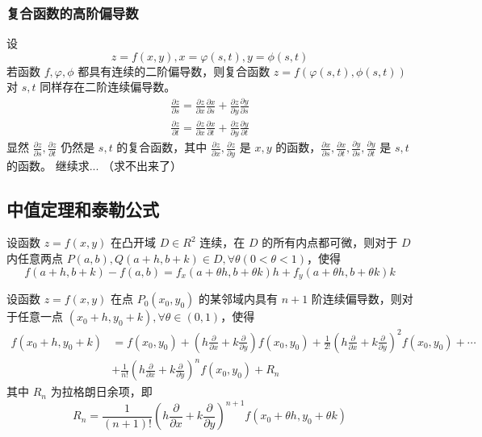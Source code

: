 \subsubsection{复合函数的高阶偏导数}

设
\[
    z=f(x,y), x=\varphi(s,t), y=\phi(s,t)
\]
若函数 $f,\varphi,\phi$ 都具有连续的二阶偏导数，则复合函数 $z=f(\varphi(s,t),\phi(s,t))$ 对 $s,t$ 同样存在二阶连续偏导数。
\[
    \begin{aligned}
        \frac{\partial z}{\partial s}=\frac{\partial z}{\partial x}\frac{\partial x}{\partial s}+\frac{\partial z}{\partial y}\frac{\partial y}{\partial s} \\
        \frac{\partial z}{\partial t}= \frac{\partial z}{\partial x}\frac{\partial x}{\partial t}+\frac{\partial z}{\partial y}\frac{\partial y}{\partial t}
    \end{aligned}
\]
显然 $\frac{\partial z}{\partial s},\frac{\partial z}{\partial t}$ 仍然是 $s,t$ 的复合函数，其中 $\frac{\partial z}{\partial x},\frac{\partial z}{\partial y}$ 是 $x,y$ 的函数，$\frac{\partial x}{\partial s},\frac{\partial x}{\partial t}, \frac{\partial y}{\partial s}, \frac{\partial y}{\partial t}$ 是 $s,t$ 的函数。
继续求... （求不出来了）

\subsection{中值定理和泰勒公式}

\begin{theorem}[拉格朗日中值定理]
    设函数 $z=f(x,y)$ 在凸开域 $D\in R^2$ 连续，在 $D$ 的所有内点都可微，则对于 $D$ 内任意两点 $P(a,b),Q(a+h,b+k)\in D, \forall\theta(0<\theta<1)$，使得
    \[
        f(a+h,b+k)-f(a,b)=f_x(a+\theta h,b+\theta k)h+f_y(a+\theta h,b+\theta k)k
    \]
\end{theorem}

\begin{theorem}[泰勒公式]
    设函数 $z=f(x,y)$ 在点 $P_0(x_0,y_0)$ 的某邻域内具有 $n+1$ 阶连续偏导数，则对于任意一点 $(x_0+h,y_0+k),\forall \theta \in (0,1)$，使得
    \[
        \begin{aligned}
            f(x_0+h,y_0+k) & =f(x_0,y_0)+(h\frac{\partial}{\partial x}+k\frac{\partial}{\partial y})f(x_0,y_0)+\frac{1}{2!}(h\frac{\partial}{\partial x}+k\frac{\partial}{\partial y})^2f(x_0,y_0)+\cdots \\
                           & +\frac{1}{n!}(h\frac{\partial}{\partial x}+k\frac{\partial}{\partial y})^nf(x_0,y_0)+R_n
        \end{aligned}
    \]
    其中 $R_n$ 为拉格朗日余项，即
    \[
        R_n=\frac{1}{(n+1)!}(h\frac{\partial}{\partial x}+k\frac{\partial}{\partial y})^{n+1}f(x_0+\theta h,y_0+\theta k)
    \]
\end{theorem}

